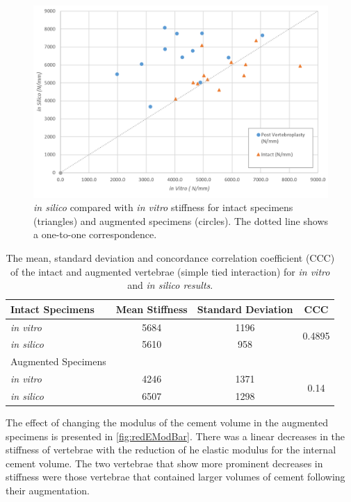 \begin{figure}[ht]
\centering
\includegraphics[width=\textwidth]{images/exp_vs_comp_both.png}
\caption{\textit{in silico} compared with \textit{in vitro} stiffness for intact specimens (triangles) and augmented specimens (circles). The dotted line shows a one-to-one correspondence.}
\label{fig:compvexpscatter}
\end{figure}

\begin{table}[ht]
\centering
	\caption{The mean, standard deviation and concordance correlation coefficient (CCC) of the intact and augmented vertebrae (simple tied interaction) for \textit{in vitro} and \textit{in silico results}.}
\label{tab:int}
\begin{tabular}{l|c|c|c}
     Intact Specimens     & Mean Stiffness & Standard Deviation & CCC                     \\ \hline \hline
\textit{in vitro}  & 5684 & 1196             & \multirow{2}{*}{0.4895} \\
\textit{in silico} & 5610 & 958               &                        \\
\hline
 Augmented Specimens
 \\ \hline \hline
\textit{in vitro}  & 4246 & 1371               & \multirow{2}{*}{0.14} \\
\textit{in silico} & 6507 & 1298               &                      \\ \hline
\end{tabular}
\end{table}

The effect of changing the modulus of the cement volume in the augmented
specimens is presented in \cref{fig:redEModBar}. There was a linear decreases
in the stiffness of vertebrae with the reduction of he elastic modulus for the
internal cement volume. The two vertebrae that show more prominent decreases in
stiffness were those vertebrae that contained larger volumes of cement
following their augmentation.

